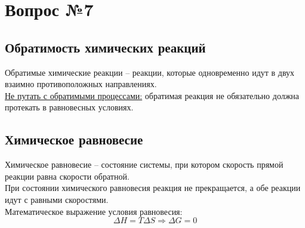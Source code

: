 \documentclass[14pt,a4paper]{scrartcl}
\begin{document}
	\section*{Вопрос №7}
	\subsection*{Обратимость химических реакций}
	Обратимые химические реакции -- реакции, которые одновременно идут в двух взаимно противоположных направлениях. \\
	\ul{Не путать с обратимыми процессами:} обратимая реакция не обязательно должна протекать в равновесных условиях.
	\subsection*{Химическое равновесие}
	Химическое равновесие -- состояние системы, при котором скорость прямой реакции равна скорости обратной. \\
	При состоянии химического равновесия реакция не прекращается, а обе реакции идут с равными скоростями. \\
	Математическое выражение условия равновесия:
	\[
	\Delta{H} = T \Delta{S} \Rightarrow \Delta{G} = 0
	\]
\end{document}
